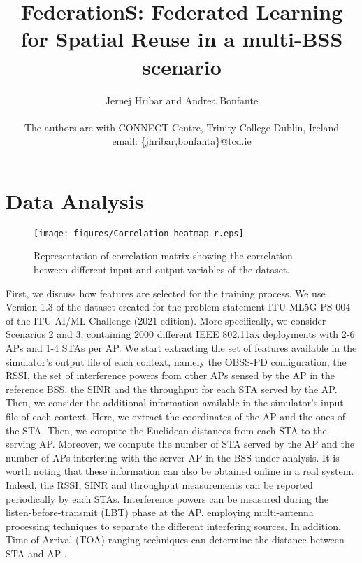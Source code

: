 \documentclass[10pt,conference ]{IEEEtran}
\title{FederationS: Federated Learning for Spatial Reuse in a multi-BSS scenario}
\author{
    Jernej Hribar and Andrea Bonfante\\ 
    \\ The authors are with CONNECT Centre, Trinity College Dublin, Ireland
    \\ email: \{jhribar,bonfanta\}@tcd.ie
    }%
\begin{document}
\maketitle

\begin{abstract}

\end{abstract}

\acresetall

\section{Data Analysis}\label{Sec: Data Analysis}


\begin{figure*}[t]
	\centering
	\texttt{[image: figures/Correlation\_heatmap\_r.eps]}
	\caption{Representation of correlation matrix showing the correlation between different input and output variables of the dataset.}
	\label{fig:Correlation heatmap}
\end{figure*}

First, we discuss how features are selected for the training process. 
We use Version 1.3 of the dataset \cite{francesc_wilhelmi_2021_5506248} created for the problem statement ITU-ML5G-PS-004 of the ITU AI/ML Challenge (2021 edition). 
More specifically, we consider Scenarios 2 and 3, containing $2000$ different IEEE 802.11ax deployments with 2-6 \acp{AP} and 1-4 \acp{STA} per \ac{AP}. 
We start extracting the set of features available in the simulator's output file of each context, namely the \ac{OBSS}-\ac{PD} configuration, the \ac{RSSI}, the set of interference powers from other \acp{AP} sensed by the \ac{AP} in the reference \ac{BSS}, the \ac{SINR} and the throughput for each \ac{STA} served by the \ac{AP}.  
Then, we consider the additional information available in the simulator's input file of each context.
Here, we extract the coordinates of the \ac{AP} and the ones of the \ac{STA}. 
Then, we compute the Euclidean distances from each \ac{STA} to the serving \ac{AP}.
Moreover, we compute the number of \ac{STA} served by the \ac{AP} and the number of \acp{AP} interfering with the server \ac{AP} in the \ac{BSS} under analysis. 
It is worth noting that these information can also be obtained  online in a real system. Indeed, the \ac{RSSI}, \ac{SINR} and throughput measurements can be reported periodically by each \acp{STA}. 
Interference powers can be measured during the listen-before-transmit (LBT) phase at the \ac{AP}, employing multi-antenna processing techniques to separate the different interfering sources. 
In addition, Time-of-Arrival (TOA) ranging techniques can determine the distance between \ac{STA} and \ac{AP} . 
\end{document}
